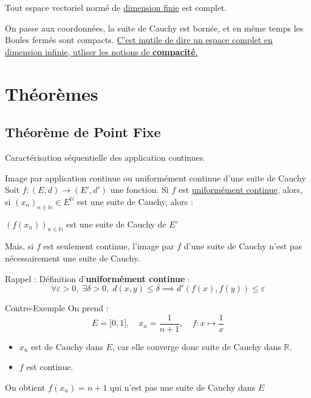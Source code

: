 \begin{Prop}{}{}
Tout espace vectoriel normé de \underline{dimension finie} est complet.
\end{Prop}


\begin{myproof}{}{}
On passe aux coordonnées, la suite de Cauchy est bornée, et en même temps les Boules fermés sont compacts. \underline{C'est inutile de dire un espace complet en dimension infinie, utliser les notions de \textbf{compacité}.}
\end{myproof}



\newpage

\section{Théorèmes}


\subsection{Théorème de Point Fixe}

Caractérisation séquentielle des application continues. 

\begin{Prop}{Image par application continue ou uniformément continue d'une suite de Cauchy}{}
  Soit $f : (E,d) \to (E', d')$ une fonction. Si $f$ est \underline{uniformément continue}, alors, si $(x_n)_{n \in \mathbb{N}} \in E ^{ \mathbb{N}}$ est une suite de Cauchy, alors :
\begin{center}
  $(f(x_n))_{n \in \mathbb{N}}$ est une suite de Cauchy de $E'$
\end{center}

Mais, si $f$ est seulement continue, l'image par $f$ d'une suite de Cauchy n'est pas nécessairement une suite de Cauchy.
\end{Prop}

\begin{myproof}{}{}
Rappel : Définition d'\textbf{uniformément continue} :
\[
  \forall \varepsilon >0, \; \exists \delta >0, \; d(x, y) \le \delta \implies d'(f(x), f(y)) \le \varepsilon
\]
\end{myproof}

\begin{Example}{Contre-Exemple}{}
On prend :
\[
  E = ]0, 1],\quad x_n = \frac{1}{n+1} , \quad f : x \mapsto \frac{1}{x}
\]
\begin{itemize}

    \item $x_n$ est de Cauchy dans $E$, car elle converge donc suite de Cauchy dans $\mathbb{R}$. 

    \item $f$ est continue.
\end{itemize}

On obtient $f(x_n)= n+1$ qui n'est pas une suite de Cauchy dans $E$
\end{Example}




